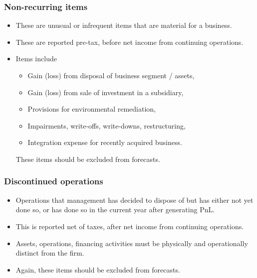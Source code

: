 \documentclass[../notes_compiled.tex]{subfiles}
\begin{document}
\subsubsection{Non-recurring items}
\begin{itemize}
\item These are unusual or infrequent items that are material for a business.
\item These are reported pre-tax, before net income from continuing operations.
\item Items include
\begin{itemize}
\item Gain (loss) from disposal of business segment / assets,
\item Gain (loss) from sale of investment in a subsidiary,
\item Provisions for environmental remediation,
\item Impairments, write-offs, write-downs, restructuring,
\item Integration expense for recently acquired business.
\end{itemize}
These items should be excluded from forecasts.
\end{itemize}

\subsubsection{Discontinued operations}
\begin{itemize}
\item Operations that management has decided to dispose of but has either not yet done so, or has done so in the current year after generating PnL.
\item This is reported net of taxes, after net income from continuing operations.
\item Assets, operations, financing activities must be physically and operationally distinct from the firm.
\item Again, these items should be excluded from forecasts.
\end{itemize}
\end{document}
